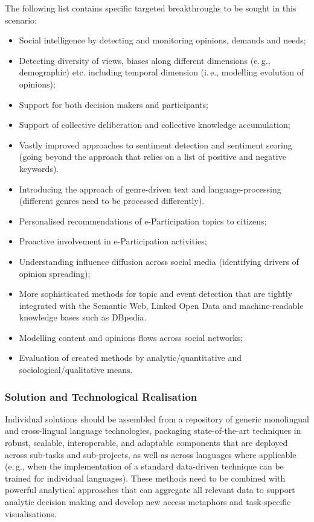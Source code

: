 \documentclass[10pt, plain]{../../metanetpaper}
\begin{document}
\begin{multicols}{2}
The following list contains specific targeted breakthroughs to be sought in this scenario:

\begin{itemize}
\item Social intelligence by detecting and monitoring opinions, demands and needs;
\item Detecting diversity of views, biases along different dimensions (e.\,g., demographic) etc. including temporal dimension (i.\,e., modelling evolution of opinions);
\item Support for both decision makers and participants;
\item Support of collective deliberation and collective knowledge accumulation;
\item Vastly improved approaches to sentiment detection and sentiment scoring (going beyond the approach that relies on a list of positive and negative keywords).
\item Introducing the approach of genre-driven text and language-processing (different genres need to be processed differently).
\item Personalised recommendations of e-Participation topics to citizens;
\item Proactive involvement in e-Participation activities;
\item Understanding influence diffusion across social media (identifying drivers of opinion spreading);
\item More sophisticated methods for topic and event detection that are tightly integrated with the Semantic Web, Linked Open Data and machine-readable knowledge bases such as DBpedia.
\item Modelling content and opinions flows across social networks;
\item Evaluation of created methods by analytic/quantitative and sociological/qualitative means.
\end{itemize}

\subsubsection{Solution and Technological Realisation}
\label{sec:solut-techn-real-pt2}

Individual solutions should be assembled from a repository of generic monolingual and cross-lingual language technologies, packaging state-of-the-art techniques in robust, scalable, interoperable, and adaptable components that are deployed across sub-tasks and sub-projects, as well as across languages where applicable (e.\,g., when the implementation of a standard data-driven technique can be trained for individual languages). These methods need to be combined with powerful analytical approaches that can aggregate all relevant data to support analytic decision making and develop new access metaphors and task-specific visualisations.
 

\end{multicols}
\end{document}
